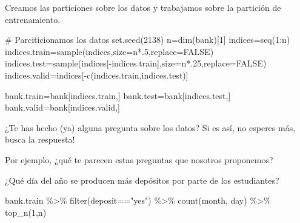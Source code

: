 \documentclass[
  letterpaper,
  DIV=11,
  numbers=noendperiod]{scrreprt}
\newenvironment{Shaded}{\begin{snugshade}}{\end{snugshade}}
\newcommand{\AttributeTok}[1]{\textcolor[rgb]{0.40,0.45,0.13}{#1}}
\newcommand{\CommentTok}[1]{\textcolor[rgb]{0.37,0.37,0.37}{#1}}
\newcommand{\ConstantTok}[1]{\textcolor[rgb]{0.56,0.35,0.01}{#1}}
\newcommand{\DecValTok}[1]{\textcolor[rgb]{0.68,0.00,0.00}{#1}}
\newcommand{\FunctionTok}[1]{\textcolor[rgb]{0.28,0.35,0.67}{#1}}
\newcommand{\NormalTok}[1]{\textcolor[rgb]{0.00,0.23,0.31}{#1}}
\newcommand{\OtherTok}[1]{\textcolor[rgb]{0.00,0.23,0.31}{#1}}
\newcommand{\SpecialCharTok}[1]{\textcolor[rgb]{0.37,0.37,0.37}{#1}}
\newcommand{\StringTok}[1]{\textcolor[rgb]{0.13,0.47,0.30}{#1}}
\begin{document}
Creamos las particiones sobre los datos y trabajamos sobre la partición
de entrenamiento.

\begin{Shaded}
\begin{Highlighting}[]
\CommentTok{\# Parciticionamos los datos}
\FunctionTok{set.seed}\NormalTok{(}\DecValTok{2138}\NormalTok{)}
\NormalTok{n}\OtherTok{=}\FunctionTok{dim}\NormalTok{(bank)[}\DecValTok{1}\NormalTok{]}
\NormalTok{indices}\OtherTok{=}\FunctionTok{seq}\NormalTok{(}\DecValTok{1}\SpecialCharTok{:}\NormalTok{n)}
\NormalTok{indices.train}\OtherTok{=}\FunctionTok{sample}\NormalTok{(indices,}\AttributeTok{size=}\NormalTok{n}\SpecialCharTok{*}\NormalTok{.}\DecValTok{5}\NormalTok{,}\AttributeTok{replace=}\ConstantTok{FALSE}\NormalTok{)}
\NormalTok{indices.test}\OtherTok{=}\FunctionTok{sample}\NormalTok{(indices[}\SpecialCharTok{{-}}\NormalTok{indices.train],}\AttributeTok{size=}\NormalTok{n}\SpecialCharTok{*}\NormalTok{.}\DecValTok{25}\NormalTok{,}\AttributeTok{replace=}\ConstantTok{FALSE}\NormalTok{)}
\NormalTok{indices.valid}\OtherTok{=}\NormalTok{indices[}\SpecialCharTok{{-}}\FunctionTok{c}\NormalTok{(indices.train,indices.test)]}

\NormalTok{bank.train}\OtherTok{=}\NormalTok{bank[indices.train,]}
\NormalTok{bank.test}\OtherTok{=}\NormalTok{bank[indices.test,]}
\NormalTok{bank.valid}\OtherTok{=}\NormalTok{bank[indices.valid,]}
\end{Highlighting}
\end{Shaded}

\begin{tcolorbox}[enhanced jigsaw, arc=.35mm, breakable, coltitle=black, left=2mm, opacityback=0, bottomtitle=1mm, colbacktitle=quarto-callout-caution-color!10!white, title=\textcolor{quarto-callout-caution-color}{\faFire}\hspace{0.5em}{Atrévete}, titlerule=0mm, colback=white, colframe=quarto-callout-caution-color-frame, bottomrule=.15mm, rightrule=.15mm, opacitybacktitle=0.6, toptitle=1mm, toprule=.15mm, leftrule=.75mm]

¿Te has hecho (ya) alguna pregunta sobre los datos? Si es así, no
esperes más, busca la respuesta!

\end{tcolorbox}

Por ejemplo, ¿qué te parecen estas preguntas que nosotros proponemos?

¿Qué día del año se producen más depósitos por parte de los estudiantes?

\begin{Shaded}
\begin{Highlighting}[]
\NormalTok{bank.train }\SpecialCharTok{\%\textgreater{}\%} 
  \FunctionTok{filter}\NormalTok{(deposit}\SpecialCharTok{==}\StringTok{"yes"}\NormalTok{) }\SpecialCharTok{\%\textgreater{}\%} 
  \FunctionTok{count}\NormalTok{(month, day) }\SpecialCharTok{\%\textgreater{}\%} 
  \FunctionTok{top\_n}\NormalTok{(}\DecValTok{1}\NormalTok{,n)}
\end{Highlighting}
\end{Shaded}
\end{document}
